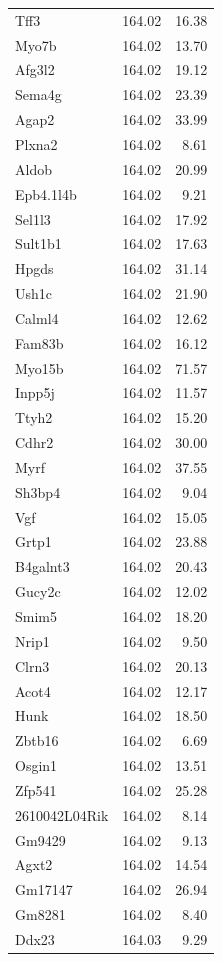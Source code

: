 \documentclass[oneside]{book}\usepackage[]{graphicx}\usepackage[]{color}
\begin{document}
\begin{appendices}
{\begin{longtable}{lrr}
  Tff3 & 164.02 & 16.38 \\
  Myo7b & 164.02 & 13.70 \\
  Afg3l2 & 164.02 & 19.12 \\
  Sema4g & 164.02 & 23.39 \\
  Agap2 & 164.02 & 33.99 \\
  Plxna2 & 164.02 & 8.61 \\
  Aldob & 164.02 & 20.99 \\
  Epb4.1l4b & 164.02 & 9.21 \\
  Sel1l3 & 164.02 & 17.92 \\
  Sult1b1 & 164.02 & 17.63 \\
  Hpgds & 164.02 & 31.14 \\
  Ush1c & 164.02 & 21.90 \\
  Calml4 & 164.02 & 12.62 \\
  Fam83b & 164.02 & 16.12 \\
  Myo15b & 164.02 & 71.57 \\
  Inpp5j & 164.02 & 11.57 \\
  Ttyh2 & 164.02 & 15.20 \\
  Cdhr2 & 164.02 & 30.00 \\
  Myrf & 164.02 & 37.55 \\
  Sh3bp4 & 164.02 & 9.04 \\
  Vgf & 164.02 & 15.05 \\
  Grtp1 & 164.02 & 23.88 \\
  B4galnt3 & 164.02 & 20.43 \\
  Gucy2c & 164.02 & 12.02 \\
  Smim5 & 164.02 & 18.20 \\
  Nrip1 & 164.02 & 9.50 \\
  Clrn3 & 164.02 & 20.13 \\
  Acot4 & 164.02 & 12.17 \\
  Hunk & 164.02 & 18.50 \\
  Zbtb16 & 164.02 & 6.69 \\
  Osgin1 & 164.02 & 13.51 \\
  Zfp541 & 164.02 & 25.28 \\
  2610042L04Rik & 164.02 & 8.14 \\
  Gm9429 & 164.02 & 9.13 \\
  Agxt2 & 164.02 & 14.54 \\
  Gm17147 & 164.02 & 26.94 \\
  Gm8281 & 164.02 & 8.40 \\
  Ddx23 & 164.03 & 9.29 \\

\end{longtable}}
\end{appendices}
\end{document}
